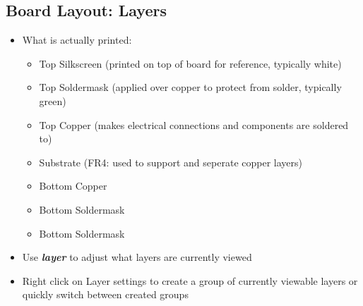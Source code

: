 \documentclass{article}
\begin{document}
\subsection{Board Layout: Layers}
\begin{itemize}
    \item What is actually printed:
    \begin{itemize}
        \item Top Silkscreen (printed on top of board for reference, typically
        white)
        \item Top Soldermask (applied over copper to protect from solder,
        typically green)
        \item Top Copper (makes electrical connections and components are
        soldered to)
        \item Substrate (FR4: used to support and seperate copper layers)
        \item Bottom Copper
        \item Bottom Soldermask
        \item Bottom Soldermask
    \end{itemize}
    \item Use \textit{\textbf{layer}} to adjust what layers are currently viewed
\end{itemize}
\begin{tcolorbox} [title=Tips \& Tricks]
    \begin{itemize}
        \item Right click on Layer settings to create a group of currently
        viewable layers or quickly switch between created groups
    \end{itemize}
\end{tcolorbox}
\end{document}
